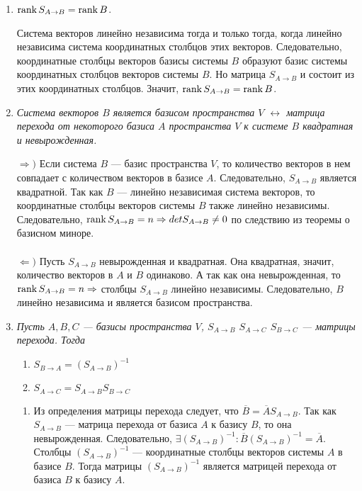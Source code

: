 \begin{enumerate}
	\item $\operatorname{rank} S_{A\rightarrow B} = \operatorname{rank} B$.
	\begin{Proof}
		Система векторов линейно независима тогда и только тогда, когда линейно независима система координатных столбцов этих векторов. Следовательно, координатные столбцы векторов базисы системы $B$ образуют базис системы координатных столбцов векторов системы $B$. Но матрица $S_{A\rightarrow B}$ и состоит из этих координатных столбцов. Значит, $\operatorname{rank} S_{A\rightarrow B} = \operatorname{rank} B$.
	\end{Proof}
	\item \textit{Система векторов $B$ является базисом пространства $V$ $\longleftrightarrow$ матрица перехода от некоторого базиса $A$ пространства $V$ к системе $B$ квадратная и невырожденная.}\begin{Proof}
		$\Rightarrow)$ Если система $B$ --- базис пространства $V$, то количество векторов в нем совпадает с количеством векторов в базисе $A$. Следовательно, $S_{A\rightarrow B}$ является квадратной. Так как $B$ --- линейно независимая система векторов, то координатные столбцы векторов системы $B$ также линейно независимы. Следовательно, $\operatorname{rank} S_{A\rightarrow B} = n\Rightarrow detS_{A\rightarrow B}\ne 0$ по следствию из теоремы о базисном миноре.\\\\
		$\Leftarrow)$ Пусть $S_{A\rightarrow B}$ невырожденная и квадратная. Она квадратная, значит, количество векторов в $A$ и $B$ одинаково. А так как она невырожденная, то $\operatorname{rank} S_{A\rightarrow B} = n\Rightarrow$ столбцы $S_{A\rightarrow B}$ линейно независимы. Следовательно, $B$ линейно независима и является базисом пространства.
	\end{Proof}
	\item \textit{Пусть $A,B,C$ --- базисы пространства $V$, $S_{A\rightarrow B}$ $S_{A\rightarrow C}$ $S_{B\rightarrow C}$ --- матрицы перехода. Тогда}\begin{enumerate}
		\item $S_{B\rightarrow A} = (S_{A\rightarrow B})^{-1}$
		\item $S_{A\rightarrow C} = S_{A\rightarrow B}S_{B\rightarrow C}$
	\end{enumerate}
	\begin{Proof}
		\begin{enumerate}
			\item Из определения матрицы перехода следует, что $\overline{B} = \overline{A}S_{A\rightarrow B}$. Так как $S_{A\rightarrow B}$ --- матрица перехода от базиса $A$ к базису $B$, то она невырожденная. Следовательно, $\exists (S_{A\rightarrow B})^{-1}:\overline{B}(S_{A\rightarrow B})^{-1} = \overline{A}$. Столбцы $(S_{A\rightarrow B})^{-1}$ --- координатные столбцы векторов системы $A$ в базисе $B$. Тогда матрицы $(S_{A\rightarrow B})^{-1}$ является матрицей перехода от базиса $B$ к базису $A$.

\end{enumerate}
\end{Proof}
\end{enumerate}
